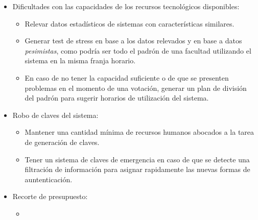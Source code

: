 \begin{itemize}
\item Dificultades con las capacidades de los recursos tecnol\'ogicos disponibles:
\begin{itemize}
\item Relevar datos estad\'isticos de sistemas con caracter\'isticas similares.
\item Generar test de stress en base a los datos relevados y en base a datos \emph{pesimistas}, como podr\'ia ser todo el padr\'on de una facultad utilizando el sistema en la misma franja horario.
\item En caso de no tener la capacidad suficiente o de que se presenten problemas en el momento de una votaci\'on, generar un plan de divisi\'on del padr\'on para sugerir horarios de utilizaci\'on del sistema.
\end{itemize}

\item Robo de claves del sistema:
\begin{itemize}
\item Mantener una cantidad m\'inima de recursos humanos abocados a la tarea de generaci\'on de claves.
\item Tener un sistema de claves de emergencia en caso de que se detecte una filtraci\'on de informaci\'on para asignar rapidamente las nuevas formas de auntenticaci\'on.
\end{itemize}

\item Recorte de presupuesto:
\begin{itemize}
\item 
\end{itemize}


\end{itemize}
